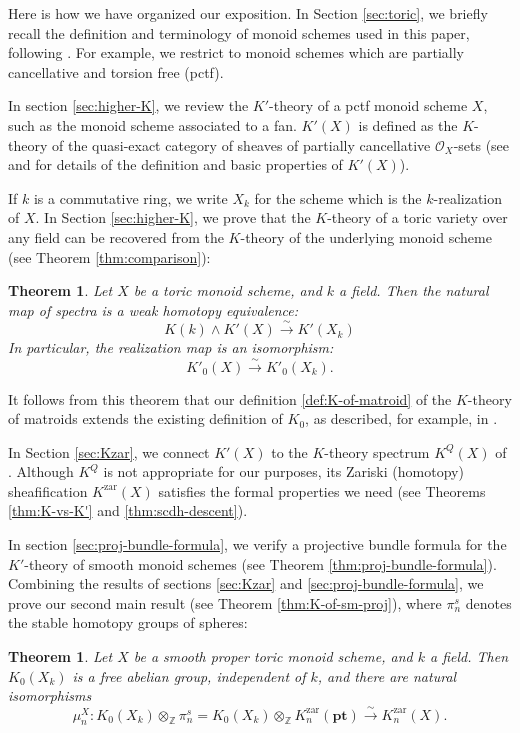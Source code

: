 \documentclass[12pt]{amsart}
\def\Kzar{K^{\mathrm{zar}}}
\newcommand{\Z}{\mathbb{Z}}
\newcommand{\pt}{\mathbf{pt}}
\numberwithin{equation}{section}
\theoremstyle{plain}
\newtheorem{thm}[equation]{Theorem}
\theoremstyle{definition}
\theoremstyle{remark}
\begin{document}
Here is how we have organized our exposition.
In Section \ref{sec:toric}, we briefly recall the definition and
terminology of monoid schemes used in this paper, following
\cite{CHWW}. For example, we restrict to monoid schemes which are
partially cancellative and torsion free (pctf).

In section \ref{sec:higher-K}, we review the $K'$-theory of a pctf
monoid scheme $X$, such as the monoid scheme associated to a fan.
$K'(X)$ is defined as the $K$-theory of the
quasi-exact category of sheaves of partially cancellative
$\mathcal{O}_X$-sets (see \cite{HW} and \cite{CW} for details
of the definition and basic properties of $K'(X)$).

If $k$ is a commutative ring, we write $X_k$ for the scheme
which is the $k$-realization of $X$. In Section
\ref{sec:higher-K}, we prove that
the $K$-theory of a toric variety over any field can be recovered
from the $K$-theory of the underlying monoid scheme (see Theorem
\ref{thm:comparison}):

\begin{thm}\label{thm:comparison-intro}
Let $X$ be a toric monoid scheme, and $k$ a field.
Then the natural map of spectra is a weak homotopy equivalence:
\[
K(k)\wedge K' (X)\xrightarrow{\sim} K'(X_k)
\]
In particular, the realization map is an isomorphism:
\[ K'_0(X)\xrightarrow{\sim} K'_0(X_k). \]
\end{thm}

It follows from this theorem that our definition
\ref{def:K-of-matroid} of the $K$-theory of matroids
extends the existing definition of $K_0$, as described, for
example, in \cite{LLPP}.

In Section \ref{sec:Kzar}, we connect $K'(X)$ to the
$K$-theory spectrum $K^Q(X)$ of \cite{ELY}.
Although $K^Q$ 
is not appropriate for our purposes, its Zariski (homotopy)
sheafification $\Kzar(X)$ satisfies the formal properties we need
(see Theorems \ref{thm:K-vs-K'} and \ref{thm:scdh-descent}).

In section \ref{sec:proj-bundle-formula}, we verify a
projective bundle formula
for the $K'$-theory of smooth monoid schemes (see Theorem
\ref{thm:proj-bundle-formula}). Combining the results of sections
\ref{sec:Kzar} and \ref{sec:proj-bundle-formula}, we prove our second
main result (see Theorem \ref{thm:K-of-sm-proj}), where $\pi_n^s$
denotes the stable homotopy groups of spheres:
 
 \begin{thm}
Let $X$ be a smooth proper toric monoid scheme, and $k$ a field.
Then $K_0(X_k)$ is a free abelian group, independent of $k$,
and there are natural isomorphisms 
\[
\mu^X_n: K_0(X_k)\otimes_\Z \pi^s_n
= K_0(X_k)\otimes_\Z \Kzar_n(\pt) \xrightarrow{\sim} \Kzar_n(X).
\]
\end{thm}
\end{document}
